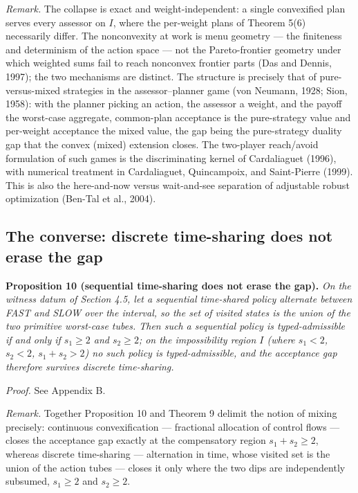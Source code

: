 \documentclass[3p,11pt]{elsarticle}
\begin{document}
\emph{Remark.} The collapse is exact and weight-independent: a single
convexified plan serves every assessor on \(I\), where the per-weight
plans of Theorem 5(6) necessarily differ. The nonconvexity at work is
menu geometry --- the finiteness and determinism of the action space ---
not the Pareto-frontier geometry under which weighted sums fail to reach nonconvex frontier parts (Das and Dennis, 1997); the two mechanisms are distinct. The structure is precisely that of
pure-versus-mixed strategies in the assessor--planner game (von Neumann,
1928; Sion, 1958): with the planner picking an action, the assessor a
weight, and the payoff the worst-case aggregate, common-plan acceptance
is the pure-strategy value and per-weight acceptance the mixed value,
the gap being the pure-strategy duality gap that the convex (mixed)
extension closes. The two-player reach/avoid formulation of such games is the discriminating kernel of Cardaliaguet (1996), with numerical treatment in Cardaliaguet, Quincampoix, and Saint-Pierre (1999). This is also the here-and-now versus wait-and-see
separation of adjustable robust optimization (Ben-Tal et al., 2004).

\subsection{The converse: discrete time-sharing does not erase
the
gap}\label{the-converse-discrete-time-sharing-does-not-erase-the-gap}

\textbf{Proposition 10 (sequential time-sharing does not erase the gap).}
\emph{On the witness datum of Section 4.5, let a sequential time-shared
policy alternate between FAST and SLOW over the interval, so the set of
visited states is the union of the two primitive worst-case tubes. Then
such a sequential policy is typed-admissible if and only if
\(s_1 \ge 2\) and \(s_2 \ge 2\); on the impossibility region \(I\)
(where \(s_1 < 2\), \(s_2 < 2\), \(s_1 + s_2 > 2\)) no such policy is
typed-admissible, and the acceptance gap therefore survives discrete
time-sharing.}

\emph{Proof.} See Appendix B.

\emph{Remark.} Together Proposition 10 and Theorem 9 delimit the notion
of mixing precisely: continuous convexification --- fractional
allocation of control flows --- closes the acceptance gap exactly at the
compensatory region \(s_1 + s_2 \ge 2\), whereas discrete time-sharing
--- alternation in time, whose visited set is the union of the action
tubes --- closes it only where the two dips are independently subsumed,
\(s_1 \ge 2\) and \(s_2 \ge 2\).
\end{document}
